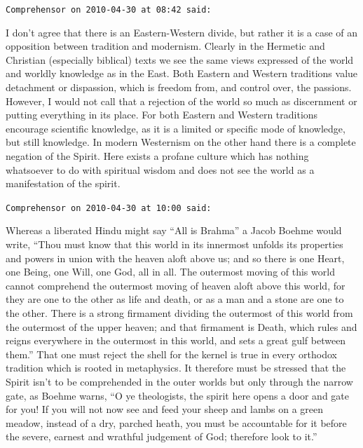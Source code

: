 \begin{footnotesize}
\begin{sffamily}
\texttt{Comprehensor on 2010-04-30 at 08:42 said:}

I don't agree that there is an Eastern-Western divide, but rather it is a case of an opposition between tradition and modernism. Clearly in the Hermetic and Christian (especially biblical) texts we see the same views expressed of the world and worldly knowledge as in the East. Both Eastern and Western traditions value detachment or dispassion, which is freedom from, and control over, the passions. However, I would not call that a rejection of the world so much as discernment or putting everything in its place. For both Eastern and Western traditions encourage scientific knowledge, as it is a limited or specific mode of knowledge, but still knowledge. In modern Westernism on the other hand there is a complete negation of the Spirit. Here exists a profane culture which has nothing whatsoever to do with spiritual wisdom and does not see the world as a manifestation of the spirit.

\hfill

\texttt{Comprehensor on 2010-04-30 at 10:00 said:}

Whereas a liberated Hindu might say ``All is Brahma'' a Jacob Boehme would write, ``Thou must know that this world in its innermost unfolds its properties and powers in union with the heaven aloft above us; and so there is one Heart, one Being, one Will, one God, all in all. The outermost moving of this world cannot comprehend the outermost moving of heaven aloft above this world, for they are one to the other as life and death, or as a man and a stone are one to the other. There is a strong firmament dividing the outermost of this world from the outermost of the upper heaven; and that firmament is Death, which rules and reigns everywhere in the outermost in this world, and sets a great gulf between them.'' That one must reject the shell for the kernel is true in every orthodox tradition which is rooted in metaphysics. It therefore must be stressed that the Spirit isn't to be comprehended in the outer worlds but only through the narrow gate, as Boehme warns, ``O ye theologists, the spirit here opens a door and gate for you! If you will not now see and feed your sheep and lambs on a green meadow, instead of a dry, parched heath, you must be accountable for it before the severe, earnest and wrathful judgement of God; therefore look to it.''

\hfill


\end{sffamily}
\end{footnotesize}
